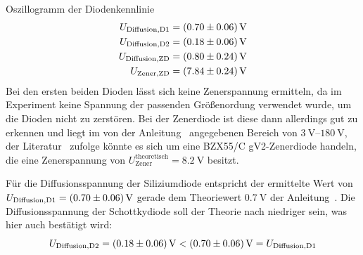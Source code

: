 \documentclass{article}
\theoremstyle{definition}
\begin{document}
\begin{aufgabe}{Oszillogramm der Diodenkennlinie}
    \begin{align*}
        U_\mathrm{Diffusion, D1} &= \SI{0.7 +- 0.06}{\volt} \\
        U_\mathrm{Diffusion, D2} &= \SI{0.18 +- 0.06}{\volt} \\
        U_\mathrm{Diffusion, ZD} &= \SI{0.8 +- 0.24}{\volt} \\
        U_\mathrm{Zener, ZD} &= \SI{7.84 +- 0.24}{\volt} \\
    \end{align*}
    Bei den ersten beiden Dioden lässt sich keine Zenerspannung ermitteln, da im Experiment keine Spannung der passenden Größenordung verwendet wurde, um die Dioden nicht zu zerstören. Bei der Zenerdiode ist diese dann allerdings gut zu erkennen und liegt im von der Anleitung~\cite{anleitung} angegebenen Bereich von $\SIrange{3}{180}{\volt}$, der Literatur~\cite{zenerspannungen} zufolge könnte es sich um eine BZX55/C  gV2-Zenerdiode handeln, die eine Zenerspannung von $U_\mathrm{Zener}^\mathrm{theoretisch} = \SI{8.2}{\volt}$ besitzt.

    Für die Diffusionsspannung der Siliziumdiode entspricht der ermittelte Wert von $U_\mathrm{Diffusion, D1} = \SI{0.7 +- 0.06}{\volt}$ gerade dem Theoriewert $\SI{0.7}{\volt}$ der Anleitung~\cite{anleitung}. Die Diffusionsspannung der Schottkydiode soll der Theorie nach niedriger sein, was hier auch bestätigt wird: 
    \begin{equation*}
        U_\mathrm{Diffusion, D2} = \SI{0.18 +- 0.06}{\volt} < \SI{0.7 +- 0.06}{\volt} = U_\mathrm{Diffusion, D1}
    \end{equation*}
    
\end{aufgabe}
\end{document}
